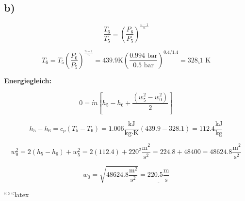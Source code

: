 

\subsection*{b)}

\begin{equation*}
    \frac{T_6}{T_5} = \left( \frac{P_6}{P_5} \right)^{\frac{n-1}{n}}
\end{equation*}

\begin{equation*}
    T_6 = T_5 \left( \frac{P_0}{P_5} \right)^{\frac{n-1}{n}} = 439.9 \text{K} \left( \frac{0.994 \text{ bar}}{0.5 \text{ bar}} \right)^{0.4/1.4} = \underline{328.1 \text{ K}}
\end{equation*}

\textbf{Energiegleich:}

\begin{equation*}
    0 = \dot{m} \left[ h_5 - h_6 + \frac{(w_5^2 - w_0^2)}{2} \right]
\end{equation*}

\begin{equation*}
    h_5 - h_6 = c_p \left( T_5 - T_6 \right) = 1.006 \frac{\text{kJ}}{\text{kg} \cdot \text{K}} (439.9 - 328.1) = 112.4 \frac{\text{kJ}}{\text{kg}}
\end{equation*}

\begin{equation*}
    w_0^2 = 2 (h_5 - h_6) + w_5^2 = 2 (112.4) + 220^2 \frac{\text{m}^2}{\text{s}^2} = 224.8 + 48400 = 48624.8 \frac{\text{m}^2}{\text{s}^2}
\end{equation*}

\begin{equation*}
    w_0 = \sqrt{48624.8 \frac{\text{m}^2}{\text{s}^2}} = \underline{220.5 \frac{\text{m}}{\text{s}}}
\end{equation*}

``````latex